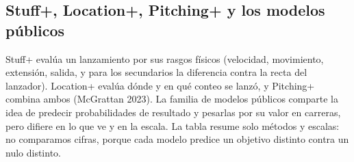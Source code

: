 \documentclass[
  english,
  spanish,
  10pt,
  letterpaper,
]{article}
\begin{document}
\subsection{Stuff+, Location+, Pitching+ y los modelos
públicos}\label{stuff-location-pitching-y-los-modelos-puxfablicos}

Stuff+ evalúa un lanzamiento por sus rasgos físicos (velocidad,
movimiento, extensión, salida, y para los secundarios la diferencia
contra la recta del lanzador). Location+ evalúa dónde y en qué conteo se
lanzó, y Pitching+ combina ambos (McGrattan 2023). La familia de modelos
públicos comparte la idea de predecir probabilidades de resultado y
pesarlas por su valor en carreras, pero difiere en lo que ve y en la
escala. La tabla resume solo métodos y escalas: no comparamos cifras,
porque cada modelo predice un objetivo distinto contra un nulo distinto.
\end{document}
